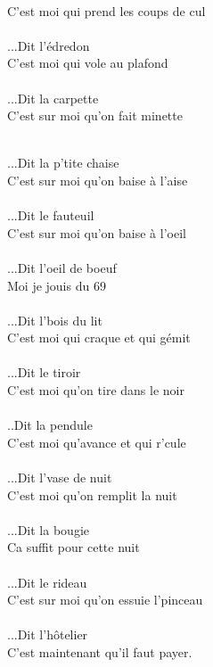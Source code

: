 \\C'est moi qui prend les coups de cul
\\\\...Dit l'édredon
\\C'est moi qui vole au plafond
\\\\...Dit la carpette
\\C'est sur moi qu'on fait minette
\\\\
\begin{minipage}{0.6\textwidth}
...Dit la p'tite chaise 
\\C'est sur moi qu'on baise à l'aise
\\\\...Dit le fauteuil
\\C'est sur moi qu'on baise à l'oeil
\\\\...Dit l'oeil de boeuf
\\Moi je jouis du 69
\\\\...Dit l'bois du lit
\\C'est moi qui craque et qui gémit
\\\\...Dit le tiroir
\\C'est moi qu'on tire dans le noir
\\\\..Dit la pendule
\\C'est moi qu'avance et qui r'cule
\\\\...Dit l'vase de nuit
\\C'est moi qu'on remplit la nuit
\\\\...Dit la bougie
\\Ca suffit pour cette nuit
\\\\...Dit le rideau
\\C'est sur moi qu'on essuie l'pinceau
\\\\...Dit l'hôtelier
\\C'est maintenant qu'il faut payer.
\end{minipage}
